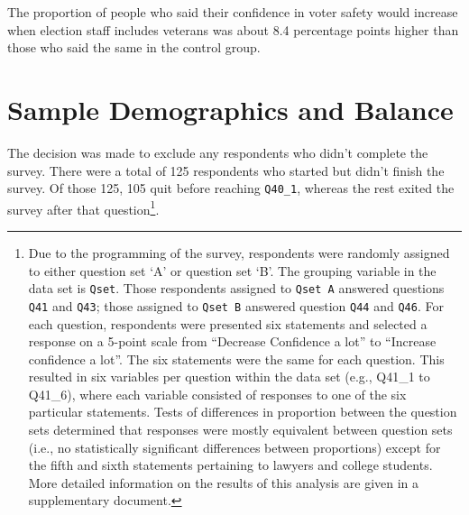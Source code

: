 \documentclass[
  11pt,
  a4paper,
]{article}
\begin{document}
\begin{figure}


\caption{\label{fig-q43-likert}}

\end{figure}%

The proportion of people who said their confidence in voter safety would
increase when election staff includes veterans was about 8.4 percentage
points higher than those who said the same in the control group.

\section{Sample Demographics and
Balance}\label{sample-demographics-and-balance}

The decision was made to exclude any respondents who didn't complete the
survey. There were a total of 125 respondents who started but didn't
finish the survey. Of those 125, 105 quit before reaching
\texttt{Q40\_1}, whereas the rest exited the survey after that
question\footnote{Due to the programming of the survey, respondents were
  randomly assigned to either question set `A' or question set `B'. The
  grouping variable in the data set is \texttt{Qset}. Those respondents
  assigned to \texttt{Qset\ A} answered questions \texttt{Q41} and
  \texttt{Q43}; those assigned to \texttt{Qset\ B} answered question
  \texttt{Q44} and \texttt{Q46}. For each question, respondents were
  presented six statements and selected a response on a 5-point scale
  from ``Decrease Confidence a lot'' to ``Increase confidence a lot''.
  The six statements were the same for each question. This resulted in
  six variables per question within the data set (e.g., Q41\_1 to
  Q41\_6), where each variable consisted of responses to one of the six
  particular statements. Tests of differences in proportion between the
  question sets determined that responses were mostly equivalent between
  question sets (i.e., no statistically significant differences between
  proportions) except for the fifth and sixth statements pertaining to
  lawyers and college students. More detailed information on the results
  of this analysis are given in a supplementary document.}.
\end{document}
